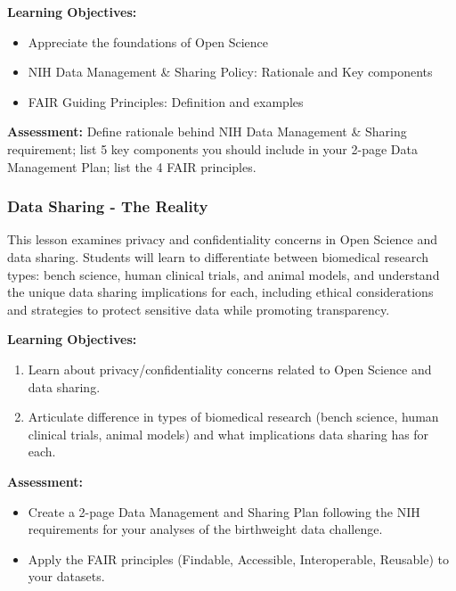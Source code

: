 \textbf{Learning Objectives:}
\begin{itemize}
    \item Appreciate the foundations of Open Science
    \item NIH Data Management \& Sharing Policy: Rationale and Key components
    \item FAIR Guiding Principles: Definition and examples
\end{itemize}

\textbf{Assessment:} Define rationale behind NIH Data Management \& Sharing requirement; list 5 key components you should include in your 2-page Data Management Plan; list the 4 FAIR principles.

\subsubsection{Data Sharing - The Reality}

This lesson examines privacy and confidentiality concerns in Open Science and data sharing. Students will learn to differentiate between biomedical research types: bench science, human clinical trials, and animal models, and understand the unique data sharing implications for each, including ethical considerations and strategies to protect sensitive data while promoting transparency.

\textbf{Learning Objectives:}
\begin{enumerate}
    \item Learn about privacy/confidentiality concerns related to Open Science and data sharing.
    \item Articulate difference in types of biomedical research (bench science, human clinical trials, animal models) and what implications data sharing has for each.
\end{enumerate}

\textbf{Assessment:}
\begin{itemize}
    \item Create a 2-page Data Management and Sharing Plan following the NIH requirements for your analyses of the birthweight data challenge.
    \item Apply the FAIR principles (Findable, Accessible, Interoperable, Reusable) to your datasets.
\end{itemize}


